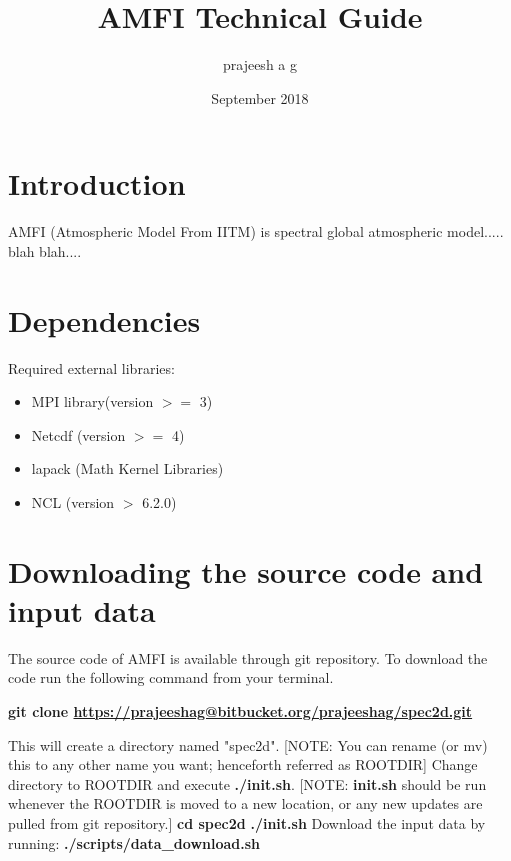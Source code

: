 \documentclass{article}
\title{AMFI Technical Guide}
\author{prajeesh a g }
\date{September 2018}
\begin{document}
\maketitle

\section{Introduction}
AMFI (Atmospheric Model From IITM) is spectral global atmospheric model..... blah blah....
\section{Dependencies}
Required external libraries:
\begin{itemize}
    \item MPI library(version $>=$ 3)
    \item Netcdf (version $>=$ 4)
    \item lapack (Math Kernel Libraries)
    \item NCL (version $>$ 6.2.0)
\end{itemize}
\section{Downloading the source code and input data}
The source code of AMFI is available through git repository. To download the code run the following command from your terminal.

\textbf{git clone \url{https://prajeeshag@bitbucket.org/prajeeshag/spec2d.git}}

This will create a directory named "spec2d". [NOTE: You can rename (or mv) this to any other name you want; henceforth referred as ROOTDIR]\newline
Change directory to ROOTDIR and execute \textbf{./init.sh}. [NOTE: \textbf{init.sh} should be run whenever the ROOTDIR is moved to a new location, or any new updates are pulled from git repository.]\newline
\textbf{cd spec2d} \newline
\textbf{./init.sh} \newline
Download the input data by running:
\textbf{./scripts/data\_download.sh}
\end{document}
